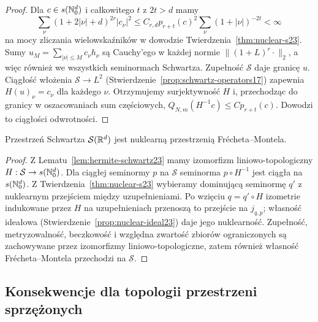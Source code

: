 \begin{proof}
Dla $c\in s(\mathbb N_0^d)$ i całkowitego $t$ z $2t>d$ mamy
\[
 \sum_\nu(1+2|\nu|+d)^{2r}|c_\nu|^2
 \le C_{r,d}p_{r+t}(c)^2
 \sum_\nu(1+|\nu|)^{-2t}<\infty
\]
na mocy zliczania wielowskaźników w dowodzie
Twierdzenia~\ref{thm:nuclear-s23}.
Sumy $u_M=\sum_{|\nu|\le M}c_\nu h_\nu$ są Cauchy'ego
w każdej normie $\|(1+L)^r\cdot\|_2$, a więc również
we wszystkich seminormach Schwartza. Zupełność
$\mathcal S$ daje granicę $u$. Ciągłość włożenia
$\mathcal S\to L^2$ (Stwierdzenie~\ref{prop:schwartz-operators17})
zapewnia $H(u)_\nu=c_\nu$ dla każdego $\nu$.
Otrzymujemy surjektywność $H$ i, przechodząc do granicy
w oszacowaniach sum częściowych,
$Q_{N,m}(H^{-1}c)\le C p_{r+t}(c)$.
Dowodzi to ciągłości odwrotności.
\end{proof}

\begin{wniosek}
\label{cor:nuclear-schwartz23}
Przestrzeń Schwartza $\mathcal S(\mathbb R^d)$ jest nuklearną
przestrzenią Frécheta--Montela.
\end{wniosek}
\begin{proof}
Z Lematu~\ref{lem:hermite-schwartz23} mamy izomorfizm
liniowo-topologiczny $H:\mathcal S\to s(\mathbb N_0^d)$.
Dla ciągłej seminormy $p$ na $\mathcal S$ seminorma
$p\circ H^{-1}$ jest ciągła na $s(\mathbb N_0^d)$.
Z Twierdzenia~\ref{thm:nuclear-s23} wybieramy dominującą
seminormę $q'$ z nuklearnym przejściem między
uzupełnieniami. Po wzięciu $q=q'\circ H$ izometrie
indukowane przez $H$ na uzupełnieniach przenoszą
to przejście na $j_{q,p}$; własność ideałowa
(Stwierdzenie~\ref{prop:nuclear-ideal23}) daje jego
nuklearność. Zupełność, metryzowalność, beczkowość
i względna zwartość zbiorów ograniczonych są zachowywane
przez izomorfizmy liniowo-topologiczne, zatem również
własność Frécheta--Montela przechodzi na $\mathcal S$.
\end{proof}

\subsection{Konsekwencje dla topologii przestrzeni sprzężonych}

